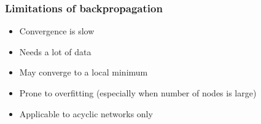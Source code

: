\documentclass[10pt]{beamer}
\begin{document}
\begin{frame}
\frametitle{Limitations of backpropagation}
\begin{itemize}
\item Convergence is slow
\item Needs a lot of data
\item May converge to a local minimum
\item Prone to overfitting (especially when number of nodes is large)
\item Applicable to acyclic networks only
\end{itemize}
\end{frame}

\end{document}
